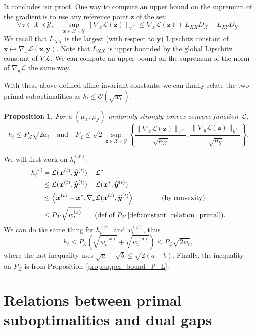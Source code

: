 \documentclass[twoside]{article}
\renewcommand{\L}{\mathcal{L}}
\newcommand{\X}{\mathcal{X}}
\newcommand{\Y}{\mathcal{Y}}
\newcommand{\M}{\X \times \Y}
\newcommand{\prodscal}[2]{\left\langle#1,#2\right\rangle}
\newcommand{\x}{\bm{x}}
\newcommand{\y}{\bm{y}}
\newcommand{\z}{\bm{z}}
\newcommand{\xt}{\bm{x}^{(t)}}
\newcommand{\ytm}{\widehat{\bm{y}}^{(t)}}
\newcommand{\wt}{w_t}
\newtheorem{proposition}[definition]{Proposition}
\newcommand{\0}{\mathbf{0}} %
\begin{document}
It concludes our proof.
\endproof 
One way to compute an upper bound on the supremum of the gradient is to use any reference point $\bar{\z}$ of the set:
\begin{equation}
  \forall \bar{z} \in \M, \quad \sup_{\z \in \M}\| \nabla_x \L(\z) \|_{\X^*} 
  \leq \nabla_x \L(\bar{\z}) + L_{XX} D_\X + L_{XY} D_\Y.
\end{equation}
We recall that $L_{XX}$ is the largest (with respect to $\y$) Lipschitz constant of $\x \mapsto \nabla_x \L(\x,\y)$. Note that $L_{XX}$ is upper bounded by the global Lipschitz constant of $\nabla \L$. We can compute an upper bound on the supremum of the norm of $\nabla_y \L$ the same way.

With these above defined affine invariant constants,  we can finally relate the two primal suboptimalities as $h_t \leq \mathcal{O}(\sqrt{w_t})$.
\begin{proposition}
\label{prop:relation_primal}
For a $(\mu_\X,\mu_\Y)$-uniformly strongly convex-concave function $\L$,
\begin{equation}
  h_t \leq P_\L \sqrt{2w_t} 
  \quad 
  \text{and} \quad
  P_\L \leq \sqrt{2} \underset{\z \in \M}{\sup} \left\{\frac{\|\nabla_x \L(\z)\|_{\X^*}}{\sqrt{\mu_\X}} ,\frac{\|\nabla_y \L(\z)\|_{\Y^*}}{\sqrt{\mu_\Y}}   \right\}.
\end{equation}
\end{proposition}

\proof We will first work on $h_t^{(x)}$:
  \begin{align*}
   h_t^{(x)} &=\L(\xt,\ytm) -\L^* \\
    &\leq \L(\xt,\ytm) -\L(\x^*,\ytm)\\
    &\leq \prodscal{\xt - \x^*}{\nabla_x \L(\xt,\ytm} 
      \qquad\qquad \text{(by convexity)}\\
    & \leq P_\X \sqrt{\wt^{(x)}} \qquad (\text{def of } P_\X \: \eqref{def:constant_relation_primal}).
  \end{align*}
We can do the same thing for $h_t^{(y)}$ and $w_t^{(y)}$, thus 
\begin{equation}
h_t \leq P_\L \left(\sqrt{\wt^{(x)}} + \sqrt{\wt^{(y)}} \right) \leq P_\L \sqrt{2 w_t} ,    
\end{equation}
where the last inequality uses $\sqrt{a} + \sqrt{b} \leq \sqrt{2 (a+b)}$.
Finally, the inequality on $P_\L$ is from Proposition~\ref{prop:upper_bound_P_L}.
\endproof
%

\section{Relations between primal suboptimalities and dual gaps}\label{sec:relations_gaps}
\end{document}
